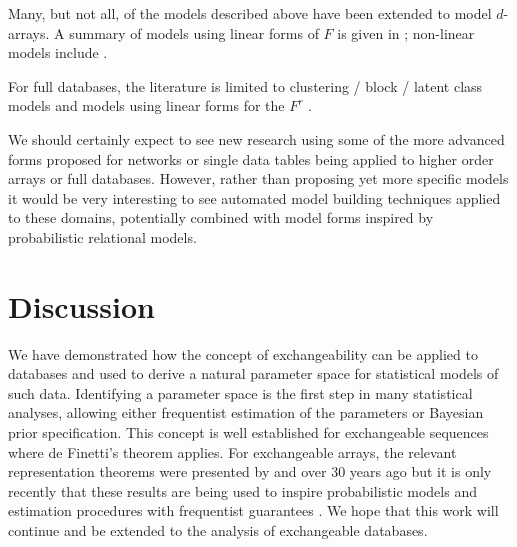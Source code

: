 Many, but not all, of the models described above have been extended to model $d$-arrays.
A summary of models using linear forms of $F$ is given in \cite{Kolda2009-ba}; non-linear models include \cite{Xu2012-ub}.

For full databases, the literature is limited to clustering / block / latent class models \citep{Kemp2006-jt, Xu2006-uy} and models using linear forms for the $F^r$ \citep[e.g.][]{Lippert2008-gg, Singh2008-cb, Singh2008-qw, Jimeng2009-rw, Acar2011-vg, Gao2011-ac, Nickel2011-pi, Acar2012-no, Ermis2012-gk, Shangguan2012-ga, Singh2012-jj, Acar2013-na, Andersen2013-rg, Yin2013-we}.

We should certainly expect to see new research using some of the more advanced forms proposed for networks or single data tables being applied to higher order arrays or full databases.
However, rather than proposing yet more specific models it would be very interesting to see automated model building techniques applied to these domains, potentially combined with model forms inspired by probabilistic relational models.

\section{Discussion}

We have demonstrated how the concept of exchangeability can be applied to databases and used to derive a natural parameter space for statistical models of such data.
Identifying a parameter space is the first step in many statistical analyses, allowing either frequentist estimation of the parameters or Bayesian prior specification.
This concept is well established for exchangeable sequences where de Finetti's theorem applies.
For exchangeable arrays, the relevant representation theorems were presented by \citet{Aldous1981-lg} and \citet{Hoover1979-br} over 30 years ago but it is only recently that these results are being used to inspire probabilistic models \citep{Hoff2007-ja, Roy2009-ge, Lloyd2012-sb} and estimation procedures with frequentist guarantees \citep{Kallenberg1999-pj, Choi2013-th, Wolfe2013-vs}.
We hope that this work will continue and be extended to the analysis of exchangeable databases.



\outbpdocument{


}
